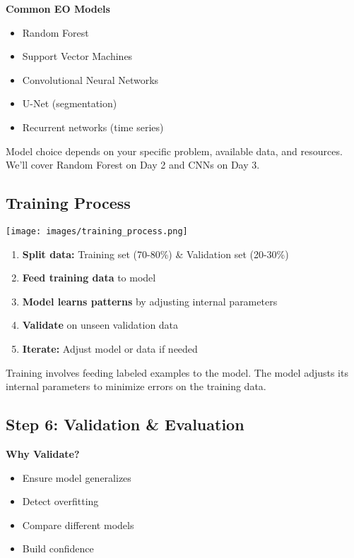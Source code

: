 \documentclass[
  letterpaper,
  DIV=11,
  numbers=noendperiod]{scrartcl}
\providecommand{\tightlist}{%
  \setlength{\itemsep}{0pt}\setlength{\parskip}{0pt}}
\begin{document}
\textbf{Common EO Models}

\begin{itemize}
\tightlist
\item
  Random Forest
\item
  Support Vector Machines
\item
  Convolutional Neural Networks
\item
  U-Net (segmentation)
\item
  Recurrent networks (time series)
\end{itemize}

Model choice depends on your specific problem, available data, and
resources. We'll cover Random Forest on Day 2 and CNNs on Day 3.

\subsection{Training Process}\label{training-process}

\begin{center}
\texttt{[image: images/training\_process.png]}
\end{center}

\begin{enumerate}
\def\labelenumi{\arabic{enumi}.}
\tightlist
\item
  \textbf{Split data:} Training set (70-80\%) \& Validation set
  (20-30\%)
\item
  \textbf{Feed training data} to model
\item
  \textbf{Model learns patterns} by adjusting internal parameters
\item
  \textbf{Validate} on unseen validation data
\item
  \textbf{Iterate:} Adjust model or data if needed
\end{enumerate}

Training involves feeding labeled examples to the model. The model
adjusts its internal parameters to minimize errors on the training data.

\subsection{Step 6: Validation \&
Evaluation}\label{step-6-validation-evaluation}

\textbf{Why Validate?}

\begin{itemize}
\tightlist
\item
  Ensure model generalizes
\item
  Detect overfitting
\item
  Compare different models
\item
  Build confidence
\end{itemize}
\end{document}
